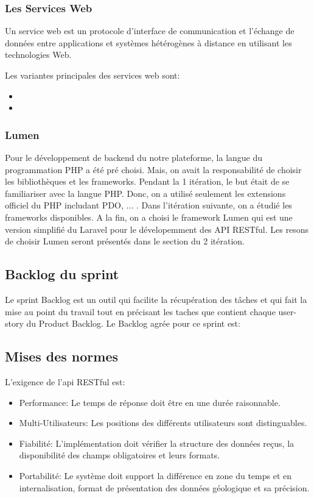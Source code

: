 \subsubsection{Les Services Web}

Un service web est un protocole d'interface de communication et l'échange de
données entre applications et systèmes hétérogènes à distance en utilisant les
technologies Web.

Les variantes principales des services web sont:
\begin{itemize}
        \item {}
        \item {}
\end{itemize}

\subsubsection{Lumen}

Pour le développement de backend du notre plateforme, la langue du programmation
PHP a été pré choisi. Mais, on avait la responsabilité de choisir les
bibliothèques et les frameworks. Pendant la 1\iere{} itération, le but était de
se familiariser avec la langue PHP. Donc, on a utilisé seulement les extensions
officiel du PHP includant PDO, $\dotsc$ . Dans l'itération suivante, on a étudié
les frameworks disponibles. A la fin, on a choisi le framework Lumen qui est
une version simplifié du Laravel pour le dévelopemment des API RESTful. Les
resons de choisir Lumen seront présentés dans le section du 2\ieme{} itération.

\subsection{Backlog du sprint}

Le sprint Backlog est un outil qui facilite la récupération des tâches et qui fait
la mise au point du travail tout en précisant les taches que contient chaque
user-story du Product Backlog.
Le Backlog agrée pour ce sprint est:


\subsection{Mises des normes}

L'exigence de l'api RESTful est:
\begin{itemize}
    \item Performance: Le temps de réponse doit être en une durée raisonnable.
    \item Multi-Utilisateurs: Les positions des différents utilisateurs sont
        distinguables.
    \item Fiabilité: L'implémentation doit vérifier la structure des données
        reçus, la disponibilité des champs obligatoires et leurs formats.
    \item Portabilité: Le système doit support la différence en zone du temps
        et en internalisation, format de présentation des données géologique et
        sa précision.
\end{itemize}

